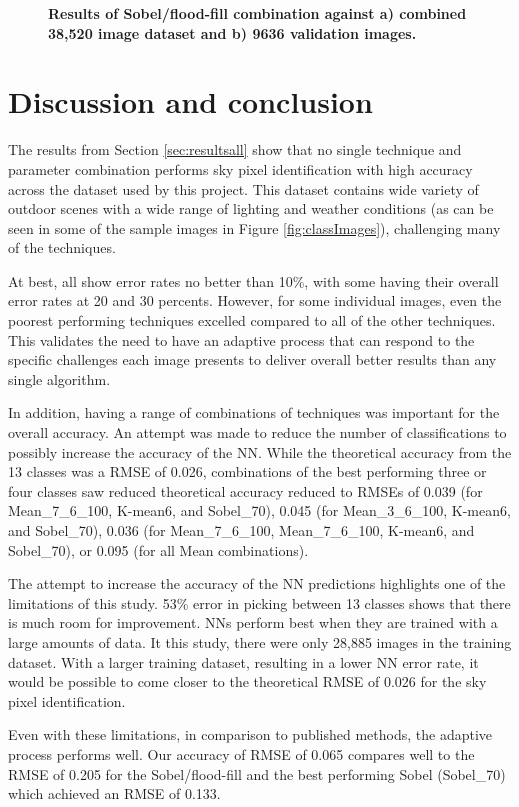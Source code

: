 \documentclass[final,3p,times,authoryear]{elsarticle}
\begin{document}
\begin{figure}
\caption{\textbf{Results of Sobel/flood-fill combination against a) combined 38,520 image dataset and b) 9636 validation images.}}
\label{fig:errorfloodall}
\end{figure}


\section{Discussion and conclusion}\label{sec:conclusion}
The results from Section \ref{sec:resultsall} show that no single technique and parameter combination performs sky pixel identification with high accuracy across the dataset used by this project. This dataset contains wide variety of outdoor scenes with a wide range of lighting and weather conditions (as can be seen in some of the sample images in Figure \ref{fig:classImages}), challenging many of the techniques. 

At best, all show error rates no better than 10\%, with some having their overall error rates at 20 and 30 percents. However, for some individual images, even the poorest performing techniques excelled compared to all of the other techniques. This validates the need to have an adaptive process that can respond to the specific challenges each image presents to deliver overall better results than any single algorithm.


In addition, having a range of combinations of techniques was important for the overall accuracy. An attempt was made to reduce the number of classifications to possibly increase the accuracy of the NN. While the theoretical accuracy from the 13 classes was a RMSE of 0.026, combinations of the best performing three or four classes saw reduced theoretical accuracy reduced to RMSEs of 0.039 (for Mean\_7\_6\_100, K-mean6, and Sobel\_70), 0.045 (for Mean\_3\_6\_100, K-mean6, and Sobel\_70), 0.036 (for Mean\_7\_6\_100, Mean\_7\_6\_100, K-mean6, and Sobel\_70), or 0.095 (for all Mean combinations). 

The attempt to increase the accuracy of the NN predictions highlights one of the limitations of this study. 53\% error in picking between 13 classes shows that there is much room for improvement. NNs perform best when they are trained with a large amounts of data. It this study, there were only 28,885 images in the training dataset. With a larger training dataset, resulting in a lower NN error rate, it would be possible to come closer to the theoretical RMSE of 0.026 for the sky pixel identification.

Even with these limitations, in comparison to published methods, the adaptive process performs well. Our accuracy of RMSE of 0.065 compares well to the RMSE of 0.205 for the Sobel/flood-fill and the best performing Sobel (Sobel\_70) which achieved an RMSE of 0.133.
\end{document}
